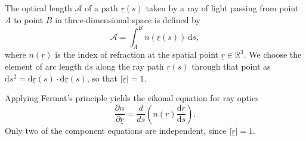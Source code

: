 \documentclass[draft]{svjour3}                     %
\begin{document}
The optical length $\mathcal{A}$ of a path $\underline{r}(s)$ taken by a ray of light passing from point $A$ to point $B$ in three-dimensional space is defined by
\begin{equation}
	\label{eq:defAA}
	\mathcal{A} = \int_A^B \! n(\underline{r}(s)) \, \mathrm{d}s,
\end{equation}
where $n(\underline{r})$ is the index of refraction at the spatial point $\underline{r} \in \mathbb{R}^3$. We choose the element of arc length $\mathrm{d}s$ along the ray path $\underline{r}(s)$ through that point as $\mathrm{d}s^2 = \mathrm{d}\underline{r}(s) \cdot \mathrm{d}\underline{r}(s)$, so that $|\dot{\underline{r}}|=1$.

Applying Fermat's principle \cite{holm2011geometric} yields the eikonal equation for ray optics
\begin{equation}
	\label{eq:axialrayequation}
	\frac{\partial n}{\partial \underline{r}} = \frac{d}{ds} \left(n(\underline{r}) \frac{\mathrm{d}\underline{r}}{\mathrm{d} s} \right).
\end{equation}
Only two of the component equations are independent, since $|\dot{\underline{r}}| = 1$.
 
\end{document}
